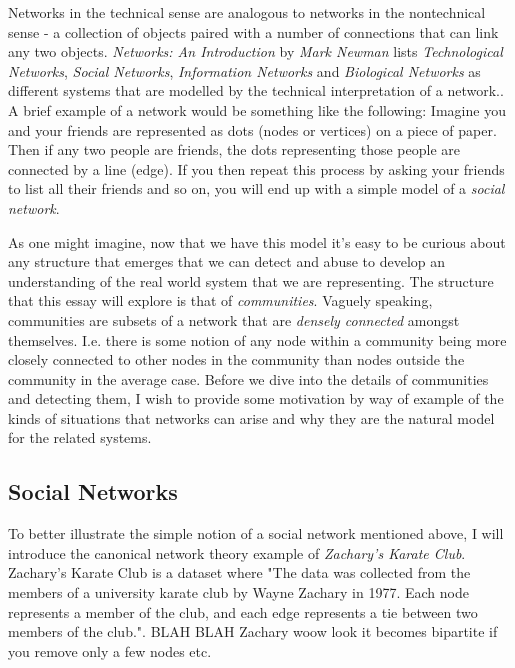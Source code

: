 Networks in the technical sense are analogous to networks in the nontechnical sense - a collection of objects paired with a number of connections that can link any two objects. \emph{Networks: An Introduction} by \emph{Mark Newman} lists \emph{Technological Networks}, \emph{Social Networks}, \emph{Information Networks} and \emph{Biological Networks} as different systems that are modelled by the technical interpretation of a network.\cite[Contents]{newman10}. A brief example of a network would be something like the following: Imagine you and your friends are represented as dots (nodes or vertices) on a piece of paper. Then if any two people are friends, the dots representing those people are connected by a line (edge). If you then repeat this process by asking your friends to list all their friends and so on, you will end up with a simple model of a \emph{social network}.

As one might imagine, now that we have this model it's easy to be curious about any structure that emerges that we can detect and abuse to develop an understanding of the real world system that we are representing. The structure that this essay will explore is that of \emph{communities}. Vaguely speaking, communities are subsets of a network that are \emph{densely connected} amongst themselves. I.e. there is some notion of any node within a community being more closely connected to other nodes in the community than nodes outside the community in the average case. Before we dive into the details of communities and detecting them, I wish to provide some motivation by way of example of the kinds of situations that networks can arise and why they are the natural model for the related systems.

\subsection{Social Networks}\label{sec:Social Networks}
To better illustrate the simple notion of a social network mentioned above, I will introduce the canonical network theory example of \emph{Zachary's Karate Club}. Zachary's Karate Club is a dataset where "The data was collected from the members of a university karate club by Wayne Zachary in 1977.  Each node represents a member of the club, and each edge represents a tie between two members of the club."\cite{konect:2017:ucidata-zachary}. BLAH BLAH Zachary woow look it becomes bipartite if you remove only a few nodes etc.

